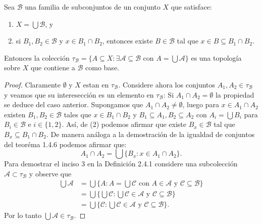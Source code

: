 \begin{proposicion}\label{pro:topologiaGenerada1}
Sea $\mathcal{B}$ una familia de subconjuntos de un conjunto $X$ que satisface:
\begin{enumerate}
    \item $X=\bigcup \mathcal{B}$, y 
    \item si $B_1,B_2\in\mathcal{B}$ y $x\in B_1\cap B_2$, entonces existe $B\in\mathcal{B}$ tal que $x\in B\subseteq B_1\cap B_2$.
\end{enumerate}
Entonces la colección $\tau_\mathcal{B}=\{A\subseteq X:\exists\mathcal{A}\subseteq\mathcal{B}\text{ con }A=\bigcup\mathcal{A}\}$ es una topología sobre $X$ que contiene a $\mathcal{B}$ como base.
\end{proposicion}
\begin{proof}
Claramente $\emptyset$ y $X$ estan en $\tau_\mathcal{B}$. Considere ahora los conjuntos $A_1,A_2\in\tau_\mathcal{B}$ y veamos que su interesección es un elemento en $\tau_\mathcal{B}$: Si $A_1\cap A_2=\emptyset$ la propiedad se deduce del caso anterior. Supongamos que $A_1\cap A_2\neq\emptyset$, luego para $x\in A_1\cap A_2$ existen $B_1,B_2\in\mathcal{B}$ tales que $x\in B_1\cap B_2$ y $B_1\subseteq A_1, B_2\subseteq A_2$ con $A_i=\bigcup B_i$ para $B_i\in\mathcal{B}$ e $i\in\{1,2\}$. Así, de (2) podemos afirmar que existe $B_x\in\mathcal{B}$ tal que $B_x\subseteq B_1\cap B_2$. De manera análoga a la demostración de la igualdad de conjuntos del teoréma 1.4.6 podemos afirmar que: 
$$A_1\cap A_2=\bigcup\{B_x:x\in A_1\cap A_2\}.$$
Para demostrar el inciso 3 en la Definición 2.4.1 considere una subcolección $\mathcal{A}\subset\tau_\mathcal{B}$ y observe que
\begin{align*}
    \bigcup\mathcal{A} &= \bigcup\{A:A=\bigcup\mathcal{C}\text{ con }A\in\mathcal{A}\text{ y }\mathcal{C}\subseteq\mathcal{B}\}\\
    &= \bigcup\{\bigcup\mathcal{C}:\bigcup\mathcal{C}\in\mathcal{A}\text{ y }\mathcal{C}\subseteq\mathcal{B}\}\\
    &= \bigcup\{\mathcal{C}:\bigcup\mathcal{C}\in\mathcal{A}\text{ y }\mathcal{C}\subseteq\mathcal{B}\}.
\end{align*}
Por lo tanto $\bigcup\mathcal{A}\in\tau_\mathcal{B}$.
\end{proof}

